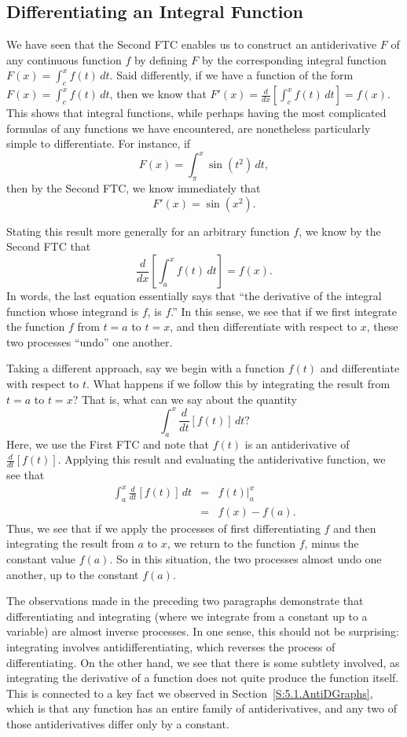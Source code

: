 \subsection*{Differentiating an Integral Function}

We have seen that the Second FTC enables us to construct an antiderivative $F$ of any continuous function $f$ by defining $F$ by the corresponding integral function $F(x) = \int_c^x f(t) \, dt$.  Said differently, if we have a function of the form $F(x) = \int_c^x f(t) \, dt$, then we know that $F'(x) = \frac{d}{dx} \left[\int_c^x f(t) \, dt \right] = f(x)$.  This shows that integral functions, while perhaps having the most complicated formulas of any functions we have encountered, are nonetheless particularly simple to differentiate.  For instance, if 
$$F(x) = \int_{\pi}^x \sin(t^2) \, dt,$$
then by the Second FTC, we know immediately that
$$F'(x) = \sin(x^2).$$

Stating this result more generally for an arbitrary function $f$, we know by the Second FTC that
$$\frac{d}{dx} \left[ \int_a^x f(t) \, dt \right] = f(x).$$
In words, the last equation essentially says that ``the derivative of the integral function whose integrand is $f$, is $f$.''  In this sense, we see that if we first integrate the function $f$ from $t = a$ to $t = x$, and then differentiate with respect to $x$, these two processes ``undo'' one another.

Taking a different approach, say we begin with a function $f(t)$ and differentiate with respect to $t$.  What happens if we follow this by integrating the result from $t = a$ to $t = x$?  That is, what can we say about the quantity
$$\int_a^x \frac{d}{dt} \left[ f(t) \right] \, dt?$$
Here, we use the First FTC and note that $f(t)$ is an antiderivative of $\frac{d}{dt} \left[ f(t) \right].$  Applying this result and evaluating the antiderivative function, we see that
\begin{eqnarray*}
\int_a^x \frac{d}{dt} \left[ f(t) \right] \, dt & = & f(t) \bigg\vert_a^x \\
							& = & f(x) - f(a).
\end{eqnarray*} 
Thus, we see that if we apply the processes of first differentiating $f$ and then integrating the result from $a$ to $x$, we return to the function $f$, minus the constant value $f(a)$.  So in this situation, the two processes almost undo one another, up to the constant $f(a)$.

The observations made in the preceding two paragraphs demonstrate that differentiating and integrating (where we integrate from a constant up to a variable) are almost inverse processes.  In one sense, this should not be surprising:  integrating involves antidifferentiating, which reverses the process of differentiating.  On the other hand, we see that there is some subtlety involved, as integrating the derivative of a function does not quite produce the function itself.  This is connected to a key fact we observed in Section~\ref{S:5.1.AntiDGraphs}, which is that any function has an entire family of antiderivatives, and any two of those antiderivatives differ only by a constant.

